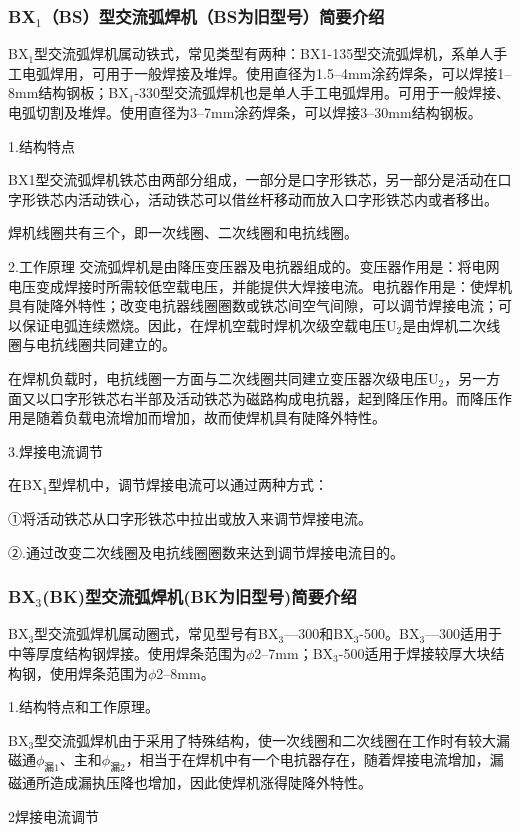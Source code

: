 \documentclass{ctexbook}
\begin{document}
\subsubsection{BX$_1$（BS）型交流弧焊机（BS为旧型号）简要介绍}
BX$_1$型交流弧焊机属动铁式，常见类型有两种：BX1-135型交流弧焊机，系单人手工电弧焊用，可用于一般焊接及堆焊。使用直径为1.5--4mm涂药焊条，可以焊接1--8mm结构钢板；BX$_1$-330型交流弧焊机也是单人手工电弧焊用。可用于一般焊接、电弧切割及堆焊。使用直径为3--7mm涂药焊条，可以焊接3--30mm结构钢板。

1.结构特点

BX1型交流弧焊机铁芯由两部分组成，一部分是口字形铁芯，另一部分是活动在口字形铁芯内活动铁心，活动铁芯可以借丝杆移动而放入口字形铁芯内或者移出。

焊机线圈共有三个，即一次线圈、二次线圈和电抗线圈。

2.工作原理
交流弧焊机是由降压变压器及电抗器组成的。变压器作用是：将电网电压变成焊接时所需较低空载电压，并能提供大焊接电流。电抗器作用是：使焊机具有陡降外特性；改变电抗器线圈圈数或铁芯间空气间隙，可以调节焊接电流；可以保证电弧连续燃烧。因此，在焊机空载时焊机次级空载电压U$_2$是由焊机二次线圈与电抗线圈共同建立的。

在焊机负载时，电抗线圈一方面与二次线圈共同建立变压器次级电压U$_2$，另一方面又以口字形铁芯右半部及活动铁芯为磁路构成电抗器，起到降压作用。而降压作用是随着负载电流增加而增加，故而使焊机具有陡降外特性。

3.焊接电流调节

在BX$_1$型焊机中，调节焊接电流可以通过两种方式：

①将活动铁芯从口字形铁芯中拉出或放入来调节焊接电流。

②.通过改变二次线圈及电抗线圈圈数来达到调节焊接电流目的。
\subsubsection{BX$_3$(BK)型交流弧焊机(BK为旧型号)简要介绍}
BX$_3$型交流弧焊机属动圈式，常见型号有BX$_3$—300和BX$_3$-500。BX$_3$—300适用于中等厚度结构钢焊接。使用焊条范围为$\phi$2--7mm；BX$_3$-500适用于焊接较厚大块结构钢，使用焊条范围为$\phi$2--8mm。

1.结构特点和工作原理。

BX$_3$型交流弧焊机由于采用了特殊结构，使一次线圈和二次线圈在工作时有较大漏磁通$\phi_{\text{漏}1}$、主和$\phi_{\text{漏}2}$，相当于在焊机中有一个电抗器存在，随着焊接电流增加，漏磁通所造成漏执压降也增加，因此使焊机涨得陡降外特性。

2焊接电流调节
\end{document}

